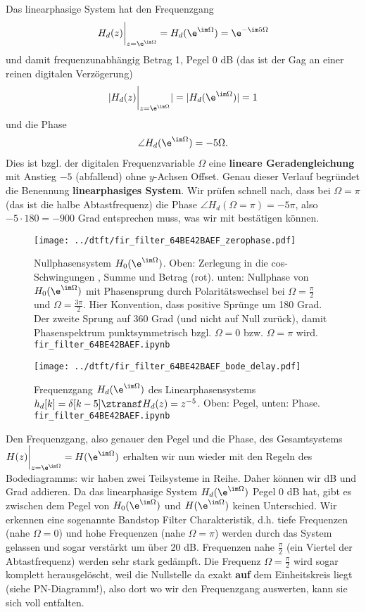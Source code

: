 Das linearphasige System hat den Frequenzgang
\begin{align}
H_d(z)\bigg|_{z=\e^{\im\Omega}} = H_d(\e^{\im \Omega}) = \e^{-\im 5 \Omega}
\end{align}
und damit frequenzunabhängig Betrag 1, Pegel 0 dB
(das ist der Gag an einer reinen digitalen Verzögerung)
\begin{align}
|H_d(z)\bigg|_{z=\e^{\im\Omega}}| = |H_d(\e^{\im \Omega})| = 1
\end{align}
und die Phase
\begin{align}
\angle H_d(\e^{\im \Omega}) = -5 \Omega.
\end{align}
Dies ist bzgl. der digitalen Frequenzvariable $\Omega$ eine \textbf{lineare
Geradengleichung} mit Anstieg $-5$ (abfallend) ohne $y$-Achsen Offset.
Genau dieser Verlauf begründet die Benennung \textbf{linearphasiges System}.
Wir prüfen schnell nach, dass bei $\Omega=\pi$ (das ist die halbe Abtastfrequenz)
die Phase $\angle H_d(\Omega=\pi) = - 5\pi$, also $-5 \cdot 180=-900$ Grad entsprechen muss,
was wir mit  bestätigen können.
%
\begin{figure}
\centering
\texttt{[image: ../dtft/fir\_filter\_64BE42BAEF\_zerophase.pdf]}
\caption{Nullphasensystem $H_0(\e^{\im \Omega})$.
Oben: Zerlegung in die cos-Schwingungen , Summe und Betrag (rot).
unten: Nullphase von $H_0(\e^{\im \Omega})$ mit
Phasensprung durch Polaritätswechsel bei $\Omega=\frac{\pi}{2}$ und $\Omega=\frac{3\pi}{2}$.
Hier Konvention, dass positive Sprünge um 180 Grad. Der zweite Sprung auf 360 Grad
(und nicht auf Null zurück), damit Phasenspektrum punktsymmetrisch bzgl.
$\Omega=0$ bzw. $\Omega=\pi$ wird. \texttt{fir\_filter\_64BE42BAEF.ipynb}
}
\label{fig:fir_filter_64BE42BAEF_zerophase}
\end{figure}
%
\begin{figure}
\centering
\texttt{[image: ../dtft/fir\_filter\_64BE42BAEF\_bode\_delay.pdf]}
\caption{Frequenzgang $H_d(\e^{\im \Omega})$ des Linearphasensystems
$h_d[k]=\delta[k-5] \ztransf H_d(z)=z^{-5}$. Oben: Pegel, unten: Phase.
\texttt{fir\_filter\_64BE42BAEF.ipynb}}
\label{fig:fir_filter_64BE42BAEF_bode_delay}
\end{figure}
%

Den Frequenzgang, also genauer den Pegel und die Phase, des
Gesamtsystems $H(z)\bigg|_{z=\e^{\im\Omega}} = H(\e^{\im \Omega})$
erhalten wir nun wieder mit den Regeln des Bodediagramms:
wir haben zwei Teilsysteme in Reihe. Daher können wir dB und Grad addieren.
Da das linearphasige System $H_d(\e^{\im \Omega})$ Pegel 0 dB hat, gibt es zwischen
dem Pegel von $H_0(\e^{\im \Omega})$ und $H(\e^{\im \Omega})$ keinen Unterschied.
Wir erkennen eine sogenannte Bandstop Filter Charakteristik, d.h. tiefe Frequenzen
(nahe $\Omega=0$) und hohe Frequenzen (nahe $\Omega=\pi$) werden durch das System
gelassen und sogar verstärkt um über 20 dB. Frequenzen nahe $\frac{\pi}{2}$ (ein Viertel
der Abtastfrequenz) werden sehr stark gedämpft. Die Frequenz $\Omega=\frac{\pi}{2}$
wird sogar komplett herausgelöscht, weil die Nullstelle da exakt \textbf{auf}
dem Einheitskreis liegt (siehe PN-Diagramm!),
also dort wo wir den Frequenzgang auswerten, kann sie sich voll entfalten.

